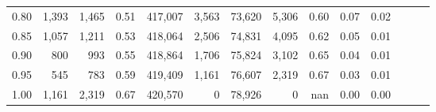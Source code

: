 \begin{tabular}{rrrrrrrrrrrrrr}
0.80 &   1,393 &  1,465 &  0.51 &  417,007 &    3,563 &  73,620 &   5,306 &  0.60 &  0.07 &      0.02 \\
0.85 &   1,057 &  1,211 &  0.53 &  418,064 &    2,506 &  74,831 &   4,095 &  0.62 &  0.05 &      0.01 \\
0.90 &     800 &    993 &  0.55 &  418,864 &    1,706 &  75,824 &   3,102 &  0.65 &  0.04 &      0.01 \\
0.95 &     545 &    783 &  0.59 &  419,409 &    1,161 &  76,607 &   2,319 &  0.67 &  0.03 &      0.01 \\
1.00 &   1,161 &  2,319 &  0.67 &  420,570 &        0 &  78,926 &       0 &   nan &  0.00 &      0.00 \\
\bottomrule
\end{tabular}
